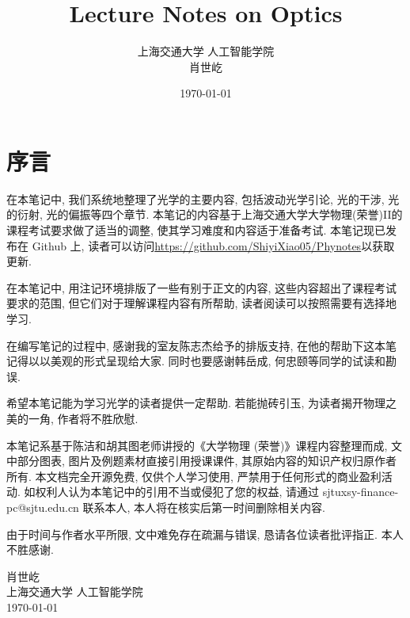\documentclass[12pt,a4paper,oneside]{report}
\title{\Huge\textbf{Lecture Notes on Optics}}
\author{\Large 上海交通大学 人工智能学院 \\
\Large 肖世屹}
\date{\today}
\theoremstyle{definition}
\theoremstyle{remark}
\begin{document}
\maketitle
\thispagestyle{empty}
\clearpage
\chapter*{序言}

在本笔记中, 我们系统地整理了光学的主要内容, 包括波动光学引论, 光的干涉, 光的衍射, 光的偏振等四个章节. 本笔记的内容基于上海交通大学大学物理(荣誉)II的课程考试要求做了适当的调整, 使其学习难度和内容适于准备考试. 本笔记现已发布在 Github 上, 读者可以访问\url{https://github.com/ShiyiXiao05/Phynotes}以获取更新.

在本笔记中, 用注记环境排版了一些有别于正文的内容, 这些内容超出了课程考试要求的范围, 但它们对于理解课程内容有所帮助, 读者阅读可以按照需要有选择地学习.

在编写笔记的过程中, 感谢我的室友陈志杰给予的排版支持, 在他的帮助下这本笔记得以以美观的形式呈现给大家. 同时也要感谢韩岳成, 何忠颐等同学的试读和勘误.

希望本笔记能为学习光学的读者提供一定帮助. 若能抛砖引玉, 为读者揭开物理之美的一角, 作者将不胜欣慰.

本笔记系基于陈洁和胡其图老师讲授的《大学物理 (荣誉)》课程内容整理而成, 文中部分图表, 图片及例题素材直接引用授课课件, 其原始内容的知识产权归原作者所有. 本文档完全开源免费, 仅供个人学习使用, 严禁用于任何形式的商业盈利活动. 如权利人认为本笔记中的引用不当或侵犯了您的权益, 请通过 sjtuxsy-finance-pc@sjtu.edu.cn 联系本人, 本人将在核实后第一时间删除相关内容.

由于时间与作者水平所限, 文中难免存在疏漏与错误, 恳请各位读者批评指正. 本人不胜感谢.

\bigskip
\begin{flushright}
肖世屹 \\
上海交通大学 人工智能学院 \\
\today
\end{flushright}
\clearpage

\tableofcontents
\clearpage

\end{document}
